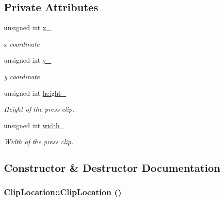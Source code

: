 \subsection*{Private Attributes}
\begin{CompactItemize}
\item 
\hypertarget{class_clip_location_6c92086530b70510102fec51da1b8929}{
unsigned int \hyperlink{class_clip_location_6c92086530b70510102fec51da1b8929}{x\_\-}}
\label{class_clip_location_6c92086530b70510102fec51da1b8929}

\begin{CompactList}\small\item\em x coordinate \item\end{CompactList}\item 
\hypertarget{class_clip_location_f7f79f07cf214a952d99c7d567034a31}{
unsigned int \hyperlink{class_clip_location_f7f79f07cf214a952d99c7d567034a31}{y\_\-}}
\label{class_clip_location_f7f79f07cf214a952d99c7d567034a31}

\begin{CompactList}\small\item\em y coordinate \item\end{CompactList}\item 
\hypertarget{class_clip_location_bf304a78eade46f1b5c6cfcf42e15643}{
unsigned int \hyperlink{class_clip_location_bf304a78eade46f1b5c6cfcf42e15643}{height\_\-}}
\label{class_clip_location_bf304a78eade46f1b5c6cfcf42e15643}

\begin{CompactList}\small\item\em Height of the press clip. \item\end{CompactList}\item 
\hypertarget{class_clip_location_e39508c504ce7807d730e58c0270d2f9}{
unsigned int \hyperlink{class_clip_location_e39508c504ce7807d730e58c0270d2f9}{width\_\-}}
\label{class_clip_location_e39508c504ce7807d730e58c0270d2f9}

\begin{CompactList}\small\item\em Width of the press clip. \item\end{CompactList}\end{CompactItemize}


\subsection{Constructor \& Destructor Documentation}
\hypertarget{class_clip_location_fb51ec03e0a8f9b33f4d785550bc6b84}{
\subsubsection[ClipLocation]{\setlength{\rightskip}{0pt plus 5cm}ClipLocation::ClipLocation ()}}
\label{class_clip_location_fb51ec03e0a8f9b33f4d785550bc6b84}


